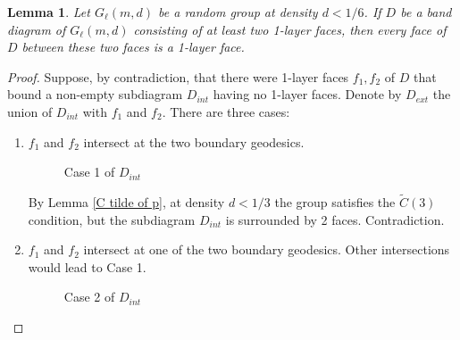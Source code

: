 \documentclass[a4paper]{article}
\def\tilde{\widetilde}
\newtheorem{lem}[thm]{Lemma}
\theoremstyle{remark}
\begin{document}
\begin{lem}\label{one layer diagram} Let $G_\ell(m,d)$ be a random group at density $d<1/6$. If $D$ be a band diagram of $G_\ell(m,d)$ consisting of at least two 1-layer faces, then every face of $D$ between these two faces is a 1-layer face.
\end{lem}
\begin{proof}
    
Suppose, by contradiction, that there were 1-layer faces $f_1,f_2$ of $D$ that bound a non-empty subdiagram $D_{int}$ having no 1-layer faces. Denote by $D_{ext}$ the union of $D_{int}$ with $f_1$ and $f_2$. There are three cases:

\begin{enumerate}
    \item $f_1$ and $f_2$ intersect at the two boundary geodesics.
    
    \begin{figure}[h]
\begin{center}
\end{center}
    \caption{Case 1 of $D_{int}$}
    \end{figure}

    By Lemma \ref{C tilde of p}, at density $d<1/3$ the group satisfies the $\tilde C(3)$ condition, but the subdiagram $D_{int}$ is surrounded by 2 faces. Contradiction.
    
    \item $f_1$ and $f_2$ intersect at one of the two boundary geodesics. Other intersections would lead to Case 1.
    
    \begin{figure}[h]
\begin{center}
\end{center}
    \caption{Case 2 of $D_{int}$}
    \end{figure}
    

\end{enumerate}
\end{proof}
\end{document}
